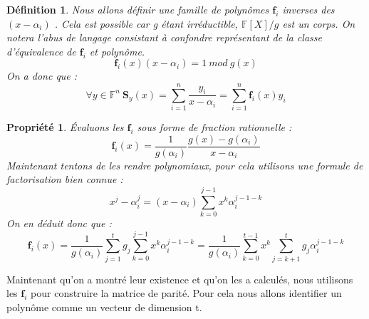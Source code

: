 \documentclass{article}
\newtheorem{prop}{Propriété}
\newtheorem{defi}{Définition}
\begin{document}
		\begin{defi}
			Nous allons définir une famille de polynômes  $ \mathbf{f}_{i} $  inverses des  $ (x-\alpha_{i}) $ . Cela est possible car g étant irréductible,  $ \mathbb{F}[X]/g $  est un corps.
			On notera l'abus de langage consistant à confondre représentant de la classe d'équivalence de $ \mathbf{f}_{i} $ et polynôme.
			 $$  \mathbf{f}_{i}(x)(x-\alpha_{i}) = 1 \ mod \ g(x) $$ 
			On a donc que :
			 $$ \forall y \in \mathbb{F}^{n} \ \mathbf{S}_{y}(x) = \sum_{i=1}^{n} \frac{y_{i}}{x-\alpha_{i}} = \sum_{i=1}^{n} \mathbf{f}_{i}(x)y_{i}  $$ 
		\end{defi}

		\begin{prop}
			Évaluons les  $ \mathbf{f}_{i} $  sous forme de fraction rationnelle :
			$$ \mathbf{f}_{i}(x) = \frac{1}{g(\alpha_{i})} \frac{g(x)-g(\alpha_{i})}{x-\alpha_{i}}  $$ 
			Maintenant tentons de les rendre polynomiaux, pour cela utilisons une formule de factorisation bien connue  :
			$$ x^{j} - \alpha_{i}^{j} = (x-\alpha_{i})\sum_{k=0}^{j-1} x^{k}\alpha_{i}^{j-1-k}$$
			On en déduit donc que :
			$$  \mathbf{f}_{i}(x) = \frac{1}{g(\alpha_{i})} \sum_{j=1}^{t} g_{j}\sum_{k=0}^{j-1} x^{k}\alpha_{i}^{j-1-k} 
			= \frac{1}{g(\alpha_{i})} \sum_{k=0}^{t-1} x^{k}\sum_{j=k+1}^{t} g_{j}\alpha_{i}^{j-1-k}$$
		\end{prop}

		Maintenant qu'on a montré leur existence et qu'on les a calculés, nous utilisons les $\mathbf{f}_{i}$ pour construire la matrice de parité.
		Pour cela nous allons identifier un polynôme comme un vecteur de dimension t.
\end{document}

